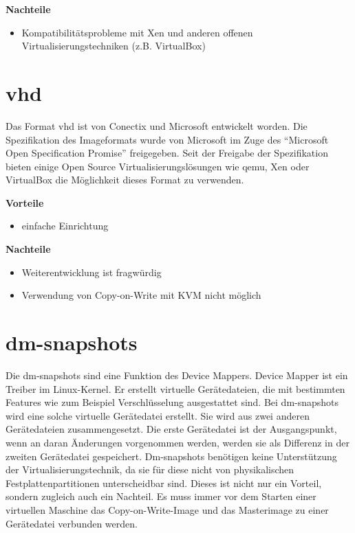 \textbf{Nachteile}
\begin{itemize}
 \item Kompatibilitätsprobleme mit Xen und anderen offenen Virtualisierungstechniken (z.B. VirtualBox)
\end{itemize}

\section{vhd}
Das Format vhd ist von Conectix und Microsoft entwickelt worden. Die Spezifikation des Imageformats wurde von Microsoft im Zuge des ``Microsoft Open Specification Promise'' freigegeben. Seit der Freigabe der Spezifikation bieten einige Open Source Virtualisierungslösungen wie qemu, Xen oder VirtualBox die Möglichkeit dieses Format zu verwenden. \cite{msosp} \cite{vhdspec} %

\textbf{Vorteile}
\begin{itemize}
 \item einfache Einrichtung
\end{itemize}

\textbf{Nachteile}
\begin{itemize}
 \item Weiterentwicklung ist fragwürdig
 \item Verwendung von Copy-on-Write mit KVM nicht möglich
\end{itemize}

\section{dm-snapshots}
Die dm-snapshots sind eine Funktion des Device Mappers. Device Mapper ist ein Treiber im Linux-Kernel. Er erstellt virtuelle Gerätedateien, die mit bestimmten Features wie zum Beispiel Verschlüsselung ausgestattet sind. Bei dm-snapshots wird eine solche virtuelle Gerätedatei erstellt. Sie wird aus zwei anderen Gerätedateien zusammengesetzt. Die erste Gerätedatei ist der Ausgangspunkt, wenn an daran Änderungen vorgenommen werden, werden sie als Differenz in der zweiten Gerätedatei gespeichert. Dm-snapshots benötigen keine Unterstützung der Virtualisierungstechnik, da sie für diese nicht von physikalischen Festplattenpartitionen unterscheidbar sind. Dieses ist nicht nur ein Vorteil, sondern zugleich auch ein Nachteil. Es muss immer vor dem Starten einer virtuellen Maschine das Copy-on-Write-Image und das Masterimage zu einer Gerätedatei verbunden werden. \cite{dmmbroz} \cite{dmkerneldoc}

